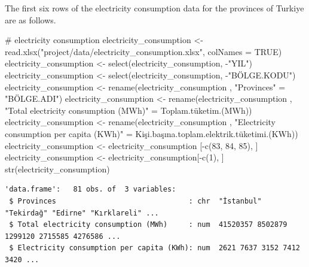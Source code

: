 \documentclass[
  11pt,
  a4paper,
  DIV=11,
  numbers=noendperiod]{scrartcl}
\newenvironment{Shaded}{\begin{snugshade}}{\end{snugshade}}
\newcommand{\AttributeTok}[1]{\textcolor[rgb]{0.40,0.45,0.13}{#1}}
\newcommand{\CommentTok}[1]{\textcolor[rgb]{0.37,0.37,0.37}{#1}}
\newcommand{\ConstantTok}[1]{\textcolor[rgb]{0.56,0.35,0.01}{#1}}
\newcommand{\DecValTok}[1]{\textcolor[rgb]{0.68,0.00,0.00}{#1}}
\newcommand{\FunctionTok}[1]{\textcolor[rgb]{0.28,0.35,0.67}{#1}}
\newcommand{\NormalTok}[1]{\textcolor[rgb]{0.00,0.23,0.31}{#1}}
\newcommand{\OtherTok}[1]{\textcolor[rgb]{0.00,0.23,0.31}{#1}}
\newcommand{\SpecialCharTok}[1]{\textcolor[rgb]{0.37,0.37,0.37}{#1}}
\newcommand{\StringTok}[1]{\textcolor[rgb]{0.13,0.47,0.30}{#1}}
\begin{document}
The first six rows of the {electricity consumption} data for the
provinces of Turkiye are as follows.

\begin{Shaded}
\begin{Highlighting}[]
\CommentTok{\# electricity consumption}
\NormalTok{electricity\_consumption }\OtherTok{\textless{}{-}} \FunctionTok{read.xlsx}\NormalTok{(}\StringTok{"project/data/electricity\_consumption.xlsx"}\NormalTok{, }\AttributeTok{colNames =} \ConstantTok{TRUE}\NormalTok{)}
\NormalTok{electricity\_consumption }\OtherTok{\textless{}{-}} \FunctionTok{select}\NormalTok{(electricity\_consumption, }\SpecialCharTok{{-}}\StringTok{"YIL"}\NormalTok{)  }
\NormalTok{electricity\_consumption }\OtherTok{\textless{}{-}} \FunctionTok{select}\NormalTok{(electricity\_consumption, }\SpecialCharTok{{-}}\StringTok{"BÖLGE.KODU"}\NormalTok{)  }
\NormalTok{electricity\_consumption  }\OtherTok{\textless{}{-}} \FunctionTok{rename}\NormalTok{(electricity\_consumption , }\StringTok{"Provinces"} \OtherTok{=} \StringTok{"BÖLGE.ADI"}\NormalTok{)}
\NormalTok{electricity\_consumption  }\OtherTok{\textless{}{-}} \FunctionTok{rename}\NormalTok{(electricity\_consumption , }\StringTok{"Total electricity consumption (MWh)"} \OtherTok{=} \StringTok{\textasciigrave{}}\AttributeTok{Toplam.tüketim.(MWh)}\StringTok{\textasciigrave{}}\NormalTok{)}
\NormalTok{electricity\_consumption  }\OtherTok{\textless{}{-}} \FunctionTok{rename}\NormalTok{(electricity\_consumption , }\StringTok{"Electricity consumption per capita (KWh)"} \OtherTok{=} \StringTok{\textasciigrave{}}\AttributeTok{Kişi.başına.toplam.elektrik.tüketimi.(KWh)}\StringTok{\textasciigrave{}}\NormalTok{)}
\NormalTok{electricity\_consumption }\OtherTok{\textless{}{-}}\NormalTok{ electricity\_consumption [}\SpecialCharTok{{-}}\FunctionTok{c}\NormalTok{(}\DecValTok{83}\NormalTok{, }\DecValTok{84}\NormalTok{, }\DecValTok{85}\NormalTok{), ]}
\NormalTok{electricity\_consumption }\OtherTok{\textless{}{-}}\NormalTok{ electricity\_consumption[}\SpecialCharTok{{-}}\FunctionTok{c}\NormalTok{(}\DecValTok{1}\NormalTok{), ]}
\FunctionTok{str}\NormalTok{(electricity\_consumption)}
\end{Highlighting}
\end{Shaded}

\begin{verbatim}
'data.frame':   81 obs. of  3 variables:
 $ Provinces                               : chr  "İstanbul" "Tekirdağ" "Edirne" "Kırklareli" ...
 $ Total electricity consumption (MWh)     : num  41520357 8502879 1299120 2715585 4276586 ...
 $ Electricity consumption per capita (KWh): num  2621 7637 3152 7412 3420 ...
\end{verbatim}
\end{document}

